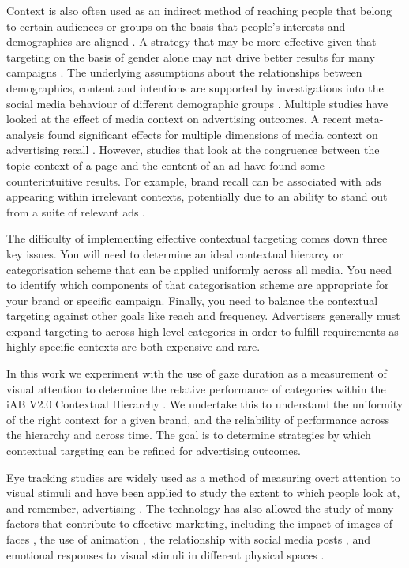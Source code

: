 \documentclass[sigconf]{acmart}
\begin{document}
Context is also often used as an indirect method of reaching people that belong to certain
audiences or groups on the basis that people's interests and demographics are aligned \cite{str2016}.
A strategy that may be more effective given that targeting on the basis of gender alone
may not drive better results for many campaigns \cite{Jansen2013}.
The underlying assumptions about the relationships between demographics,
content and intentions
are supported by investigations into the social media behaviour of different demographic
groups \cite{Wang2016}.
Multiple studies have looked at the effect of media context on advertising outcomes.
A recent meta-analysis found significant effects for multiple dimensions of
media context on advertising recall \cite{Kwon2019}.
However, studies that look at the congruence
between the topic context of a page and the content of an ad have found some
counterintuitive results. For
example, brand recall can be associated with ads appearing within irrelevant contexts,
potentially due to an ability to stand out from a suite of relevant ads \cite{Kononova2020}.

The difficulty of implementing effective contextual targeting comes down three key issues.
You will need to determine an ideal contextual hierarcy or categorisation scheme that can be
applied uniformly across all media. You need to identify which components of that categorisation
scheme are appropriate for your brand or specific campaign. Finally, you need to balance the
contextual targeting against other goals like reach and frequency.
Advertisers generally must expand targeting to across high-level categories in order to
fulfill requirements as highly specific contexts are both expensive and rare.

In this work we experiment with the use of gaze duration as a measurement of
visual attention to determine the relative performance of categories within
the iAB V2.0 Contextual Hierarchy \cite{iabv2}.
We undertake this to understand the uniformity of the right context for a given brand, and
the reliability of performance across the hierarchy and across time. The goal is to determine
strategies by which contextual targeting can be refined for advertising outcomes.

Eye tracking studies are widely used as a method of measuring overt attention
to visual stimuli and have been applied to study the extent to which people
look at, and remember, advertising \cite{Hervet2011}. The technology has also
allowed the study of many factors that contribute to effective marketing,
including the impact of images of faces \cite{Djamasbi2010},
the use of animation \cite{Hamborg2012,Lee2012}, the relationship with
social media posts \cite{Barreto2013}, and emotional responses to visual stimuli
in different physical spaces \cite{Kim2021}.
\end{document}
